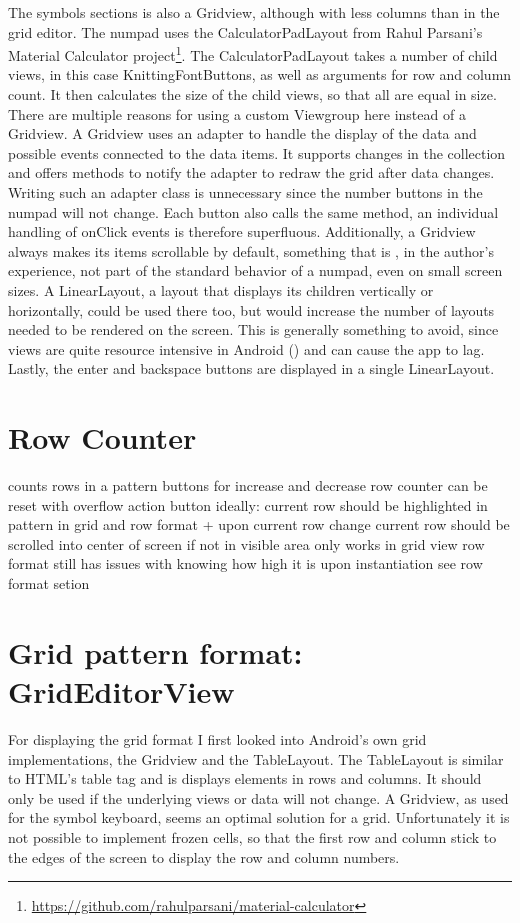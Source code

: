 The symbols sections is also a Gridview, although with less columns than in the grid editor. The numpad uses the CalculatorPadLayout from Rahul Parsani's Material Calculator project\footnote{\url{https://github.com/rahulparsani/material-calculator}}. The CalculatorPadLayout takes a number of child views, in this case KnittingFontButtons, as well as arguments for row and column count. It then calculates the size of the child views, so that all are equal in size. There are multiple reasons for using a custom Viewgroup here instead of a Gridview. A Gridview uses an adapter to handle the display of the data and possible events connected to the data items. It supports changes in the collection and offers methods to notify the adapter to redraw the grid after data changes. Writing such an adapter class is unnecessary since the number buttons in the numpad will not change. Each button also calls the same method, an individual handling of onClick events is therefore superfluous. Additionally, a Gridview always makes its items scrollable by default, something that is , in the author's experience, not part of the standard behavior of a numpad, even on small screen sizes. A LinearLayout, a layout that displays its children vertically or horizontally, could be used there too, but would increase the number of layouts needed to be rendered on the screen. This is generally something to avoid, since views are quite resource intensive in Android (\cite{android_optimizing_layouts}) and can cause the app to lag. Lastly, the enter and backspace buttons are displayed in a single LinearLayout.

\section{Row Counter}
counts rows in a pattern
buttons for increase and decrease row counter
can be reset with overflow action button
ideally: current row should be highlighted in pattern in grid and row format
+ upon current row change current row should be scrolled into center of screen if not in visible area
only works in grid view
row format still has issues with knowing how high it is upon instantiation
see row format setion

\section{Grid pattern format: GridEditorView}
For displaying the grid format I first looked into Android’s own grid implementations, the Gridview and the TableLayout. The TableLayout is similar to HTML’s table tag and is displays elements in rows and columns. It should only be used if the underlying views or data will not change. A Gridview, as used for the symbol keyboard, seems an optimal solution for a grid. Unfortunately it is not possible to implement frozen cells, so that the first row and column stick to the edges of the screen to display the row and column numbers.

